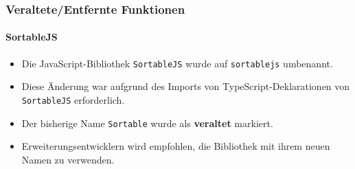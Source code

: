 %

\begin{frame}[fragile]
	\frametitle{Veraltete/Entfernte Funktionen}
	\framesubtitle{SortableJS}

	\begin{itemize}
		\item Die JavaScript-Bibliothek \texttt{SortableJS} wurde auf \texttt{sortablejs} umbenannt.

		\item Diese Änderung war aufgrund des Imports von TypeScript-Deklarationen 
			von \texttt{SortableJS} erforderlich.

		\item Der bisherige Name \texttt{Sortable} wurde als \textbf{veraltet} markiert.

		\item Erweiterungsentwicklern wird empfohlen, die Bibliothek mit ihrem neuen Namen zu verwenden.
	\end{itemize}

\end{frame}

